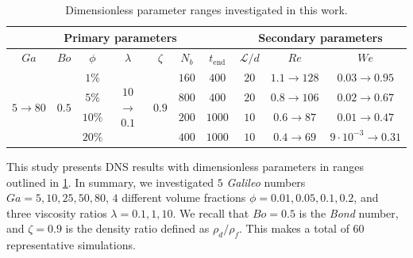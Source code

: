 \begin{table}[h!]
    \centering
    \caption{Dimensionless parameter ranges investigated in this work.}
    \begin{tabular}{|ccccccc|ccc|}
        \hline
        \multicolumn{7}{|c}{Primary parameters} & \multicolumn{3}{||c|}{Secondary parameters}\\ \hline
        \multicolumn{1}{|c|}{$Ga$}                               & \multicolumn{1}{c|}{$Bo$}                   & \multicolumn{1}{c|}{$\phi$} & \multicolumn{1}{c|}{$\lambda$}                    & \multicolumn{1}{c|}{$\zeta$}                & \multicolumn{1}{c|}{$N_b$} & $t_\text{end}$ & \multicolumn{1}{||c|}{$\mathcal{L}/d$} & \multicolumn{1}{c|}{$Re$}  & $We$   \\ \hline
        \multicolumn{1}{|c|}{\multirow{4}{*}{$5\rightarrow 80$}} & \multicolumn{1}{c|}{\multirow{4}{*}{$0.5$}} & \multicolumn{1}{c|}{$1\%$}  & \multicolumn{1}{c|}{\multirow{4}{*}{$10$ $\to$ $0.1$}} & \multicolumn{1}{c|}{\multirow{4}{*}{$0.9$}} & \multicolumn{1}{c|}{$160$} & $400$           & \multicolumn{1}{||c|}{$20$}            & \multicolumn{1}{c|}{$1.1\to 128$} & {$0.03\to 0.95$} \\ 
        \multicolumn{1}{|c|}{}                                   & \multicolumn{1}{c|}{}                       & \multicolumn{1}{c|}{$5\%$}  & \multicolumn{1}{c|}{}                             & \multicolumn{1}{c|}{}                       & \multicolumn{1}{c|}{$800$} & $400$           & \multicolumn{1}{||c|}{$20$}            & \multicolumn{1}{c|}{$0.8\to 106$} &  {$0.02\to 0.67$}\\ 
        \multicolumn{1}{|c|}{}                                   & \multicolumn{1}{c|}{}                       & \multicolumn{1}{c|}{$10\%$} & \multicolumn{1}{c|}{}                             & \multicolumn{1}{c|}{}                       & \multicolumn{1}{c|}{$200$} & $1000$           & \multicolumn{1}{||c|}{$10$}            & \multicolumn{1}{c|}{$0.6\to 87$}&  {$0.01\to 0.47$}\\ 
        \multicolumn{1}{|c|}{}                                   & \multicolumn{1}{c|}{}                       & \multicolumn{1}{c|}{$20\%$} & \multicolumn{1}{c|}{}                             & \multicolumn{1}{c|}{}                       & \multicolumn{1}{c|}{$400$} & $1000$           & \multicolumn{1}{||c|}{$10$}            & \multicolumn{1}{c|}{$0.4\to 69$}&  {$9\cdot 10^{-3}\to 0.31$}\\ \hline
        \end{tabular}
    \label{tab:simulations}
\end{table}
This study presents DNS results with dimensionless parameters in ranges outlined in \ref{tab:simulations}.
In summary, we investigated $5$ \textit{Galileo} numbers $Ga = 5,10,25,50,80$, $4$ different volume fractions $\phi = 0.01,0.05,0.1,0.2$, and three viscosity ratios $\lambda =0.1,1,10$. 
We recall that $Bo = 0.5$ is the \textit{Bond} number, and $\zeta = 0.9$ is the density ratio defined as $\rho_d/\rho_f$.
This makes a total of $60$ representative simulations.




